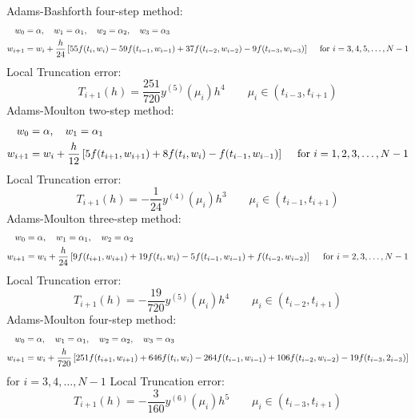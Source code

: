 \documentclass[../main-sheet.tex]{subfiles}
\begin{document}
Adams-Bashforth four-step method:
\begin{align}
    w_0&=\alpha, \quad w_1=\alpha_1,\quad w_2=\alpha_2,\quad w_3=\alpha_3\notag\\
    w_{i+1}&=w_i+\frac{h}{24}\left[ 55f(t_i,w_i)-59f(t_{i-1},w_{i-1})+37f(t_{i-2},w_{i-2})-9f(t_{i-3},w_{i-3}) \right]\quad\text{ for } i=3,4,5,\dots, N-1\label{eq:aba5}
\end{align}
Local Truncation error:
\[T_{i+1}(h)=\frac{251}{720}y^{(5)}(\mu_i)h^4\qquad \mu_i\in (t_{i-3},t_{i+1})\]
Adams-Moulton two-step method:
\begin{align}
    w_0&=\alpha, \quad w_1=\alpha_1\notag\\
    w_{i+1}&=w_i+\frac{h}{12}\left[ 5f(t_{i+1},w_{i+1})+8f(t_{i},w_{i})-f(t_{i-1},w_{i-1}) \right]\quad\text{ for } i=1,2,3,\dots, N-1 \label{eq:aba6}
\end{align}
Local Truncation error:
\[T_{i+1}(h)=-\frac{1}{24}y^{(4)}(\mu_i)h^3\qquad \mu_i\in (t_{i-1},t_{i+1})\]
Adams-Moulton three-step method:
\begin{align}
    w_0&=\alpha, \quad w_1=\alpha_1,\quad w_2=\alpha_2\notag\\
    w_{i+1}&=w_i+\frac{h}{24}\left[ 9f(t_{i+1},w_{i+1})+19f(t_{i},w_{i})-5f(t_{i-1},w_{i-1})+f(t_{i-2},w_{i-2}) \right]\quad\text{ for } i=2,3,\dots, N-1\label{eq:aba7}
\end{align}
Local Truncation error:
\[T_{i+1}(h)=-\frac{19}{720}y^{(5)}(\mu_i)h^4\qquad \mu_i\in (t_{i-2},t_{i+1})\]
Adams-Moulton four-step method:
\begin{align}
    w_0&=\alpha, \quad w_1=\alpha_1,\quad w_2=\alpha_2,\quad w_3=\alpha_3\notag\\
    w_{i+1}&=w_i+\frac{h}{720}\left[ 251f(t_{i+1},w_{i+1})+646f(t_{i},w_{i})-264f(t_{i-1},w_{i-1})+106f(t_{i-2},w_{i-2})-19f(t_{i-3},2_{i-3}) \right]
    \label{eq:aba8}
\end{align}
for \(i=3,4,\dots, N-1\)
Local Truncation error:
\[T_{i+1}(h)=-\frac{3}{160}y^{(6)}(\mu_i)h^5\qquad \mu_i\in (t_{i-3},t_{i+1})\]
\end{document}
